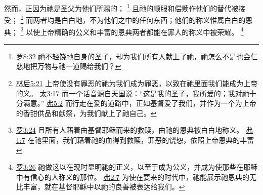 \documentclass[12pt, a4paper, oneside]{ctexart}
\begin{document}
	然而，正因为祂是圣父为他们所赐的；
	\footnote {
		\href{https://biblehub.com/romans/8-32.htm}{罗8:32} 祂不轻饶祂自身的圣子，却为我们所有人献上了祂，祂怎么不是也会仁慈地把万物与祂一道赐给我们？
	}
	且祂的顺服和偿赎作他们的替代被接受；
	\footnote {
		\href{https://biblehub.com/2_corinthians/5-21.htm}{林后5:21} 上帝使没有罪恶的祂为我们成为罪恶，以致在祂里面我们能成为上帝的义。
		\href{https://biblehub.com/matthew/3-17.htm}{太3:17} 而一个话音源自天国说：“这是我的圣子，我所爱的；我对祂十分满意。”
		\href{https://biblehub.com/ephesians/5-2.htm}{弗5:2} 而行走在爱的道路中，正如基督爱了我们，并作为一个为上帝的香甜供品和献祭，为我们献上了祂自己。
	}
	而两者均是白白地，不为他们之中的任何东西；他们的称义惟属白白的恩典；
	\footnote {
		\href{https://biblehub.com/romans/3-24.htm}{罗3:24} 且所有人藉着由基督耶稣而来的救赎，由祂的恩典被白白地称义。
		\href{https://biblehub.com/ephesians/1-7.htm}{弗1:7} 在祂里面，我们藉着祂的血得到救赎，罪恶的饶恕，依照上帝恩典的丰富
	}
	以使上帝精确的公义和丰富的恩典两者都能在罪人的称义中被荣耀。
	\footnote {
		\href{https://biblehub.com/romans/3-26.htm}{罗3:26} 祂做这以在现时显明祂的正义，以至于成为公义，并成为使那些在耶稣中有信心的人称义的那位。
		\href{https://biblehub.com/ephesians/2-7.htm}{弗2:7} 为使在要来的时代中，祂能展示祂恩典的无比丰富，就在基督耶稣中以祂的良善被表达给我们。
	}
\end{document}
